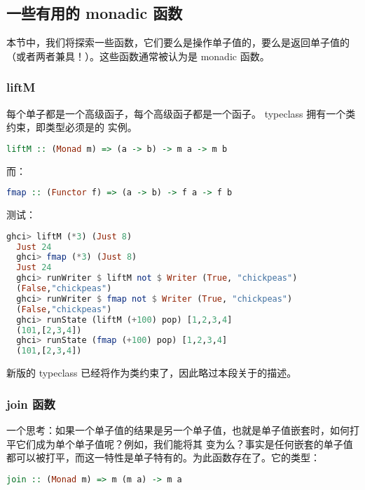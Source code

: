 \documentclass[./main.tex]{subfiles}
\begin{document}
\subsection*{一些有用的 monadic 函数}

本节中，我们将探索一些函数，它们要么是操作单子值的，要么是返回单子值的（或者两者兼具！）。这些函数通常被认为是 monadic 函数。

\subsubsection*{liftM}

每个单子都是一个高级函子，每个高级函子都是一个函子。 typeclass 拥有一个类约束，即类型必须是的
实例。

\begin{lstlisting}[language=Haskell]
  liftM :: (Monad m) => (a -> b) -> m a -> m b
\end{lstlisting}

而：

\begin{lstlisting}[language=Haskell]
  fmap :: (Functor f) => (a -> b) -> f a -> f b
\end{lstlisting}

测试：

\begin{lstlisting}[language=Haskell]
  ghci> liftM (*3) (Just 8)
  Just 24
  ghci> fmap (*3) (Just 8)
  Just 24
  ghci> runWriter $ liftM not $ Writer (True, "chickpeas")
  (False,"chickpeas")
  ghci> runWriter $ fmap not $ Writer (True, "chickpeas")
  (False,"chickpeas")
  ghci> runState (liftM (+100) pop) [1,2,3,4]
  (101,[2,3,4])
  ghci> runState (fmap (+100) pop) [1,2,3,4]
  (101,[2,3,4])
\end{lstlisting}

新版的 typeclass 已经将作为类约束了，因此略过本段关于的描述。

\subsubsection*{join 函数}

一个思考：如果一个单子值的结果是另一个单子值，也就是单子值嵌套时，如何打平它们成为单个单子值呢？例如，我们能将其
变为么？事实是任何嵌套的单子值都可以被打平，而这一特性是单子特有的。为此函数存在了。它的类型：

\begin{lstlisting}[language=Haskell]
  join :: (Monad m) => m (m a) -> m a
\end{lstlisting}
\end{document}
